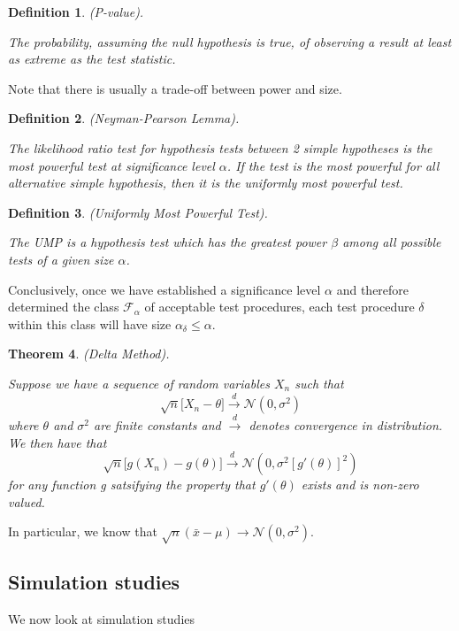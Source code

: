 \documentclass[twoside]{article}
\newcounter{lecnum}
\newtheorem{theorem}{Theorem}[lecnum]
\newtheorem{definition}[theorem]{Definition}
\begin{document}
\begin{definition}(P-value).

The probability, assuming the null hypothesis is true, of observing a result at least as extreme as the test statistic.
\end{definition}

Note that there is usually a trade-off between power and size.

\begin{definition}(Neyman-Pearson Lemma).

The likelihood ratio test for hypothesis tests between 2 simple hypotheses is the most powerful test at significance level $\alpha$. If the test is the most powerful for all alternative simple hypothesis, then it is the uniformly most powerful test.
\end{definition}

\begin{definition}(Uniformly Most Powerful Test).

The UMP is a hypothesis test which has the greatest power $\beta$ among all possible tests of a given size $\alpha$.
\end{definition}


Conclusively, once we have established a significance level $\alpha$ and therefore determined the class $\mathcal{F}_{\alpha}$ of acceptable test procedures, each test procedure $\delta$ within this class will have size $\alpha_{\delta}\leq \alpha$. 


\begin{theorem}(Delta Method).

Suppose we have a sequence of random variables $X_n$ such that
$$
\sqrt{n}\big[X_n - \theta \big] \xrightarrow{d} \mathcal{N}(0, \sigma^2)
$$
where $\theta$ and $\sigma^2$ are finite constants and $\xrightarrow{d}$ denotes convergence in distribution. We then have that
$$
\sqrt{n}\big[g(X_n) - g(\theta)\big] \xrightarrow{d} \mathcal{N}(0, \sigma^2[g'(\theta)]^2)
$$
for any function g satsifying the property that $g'(\theta)$ exists and is non-zero valued.
\end{theorem}

In particular, we know that $\sqrt{n}(\bar{x} - \mu) \rightarrow \mathcal{N}(0, \sigma^2)$.

\subsection{Simulation studies}
We now look at simulation studies
\end{document}
